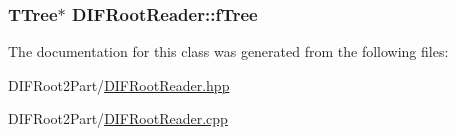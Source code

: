 \label{dc/ddc/classDIFRootReader_a250796ef6bbe231cf75da5e985961ac1}
\hypertarget{classDIFRootReader_a95ae7f9154ea46dbe4d2423e9d8f3c7d}{
\subsubsection[{fTree}]{\setlength{\rightskip}{0pt plus 5cm}TTree$\ast$ {\bf DIFRootReader::fTree}}}
\label{dc/ddc/classDIFRootReader_a95ae7f9154ea46dbe4d2423e9d8f3c7d}


The documentation for this class was generated from the following files:\begin{DoxyCompactItemize}
\item 
DIFRoot2Part/\hyperlink{DIFRootReader_8hpp}{DIFRootReader.hpp}\item 
DIFRoot2Part/\hyperlink{DIFRootReader_8cpp}{DIFRootReader.cpp}\end{DoxyCompactItemize}
